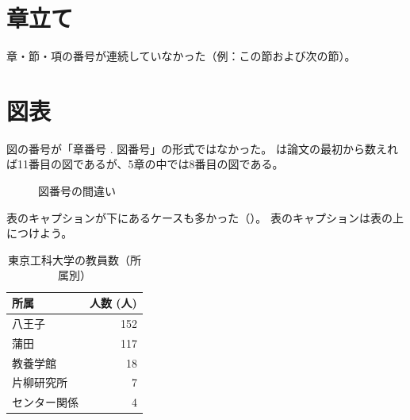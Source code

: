 \setcounter{section}{6}
\section{章立て}

章・節・項の番号が連続していなかった（例：この節および次の節）。

\setcounter{section}{6}
\section{図表}

図の番号が「章番号 . 図番号」の形式ではなかった。
は論文の最初から数えれば11番目の図であるが、5章の中では8番目の図である。

\begin{figure}[H]
  \centering
  \caption{図番号の間違い}
  \label{fig:fail-fig}
\end{figure}

表のキャプションが下にあるケースも多かった（）。
表のキャプションは表の上につけよう。

\begin{table}[htbp]
	\centering
	\begin{tabular}{l|r}
		\hline \hline
		所属 & 人数 (人)\\
		\hline
		八王子 & 152\\
    蒲田 & 117\\
    教養学館 & 18\\
    片柳研究所 & 7\\
    センター関係 & 4\\
		\hline
	\end{tabular}
  \caption{東京工科大学の教員数（所属別）}
  \label{tab:noffaculties}
\end{table}

